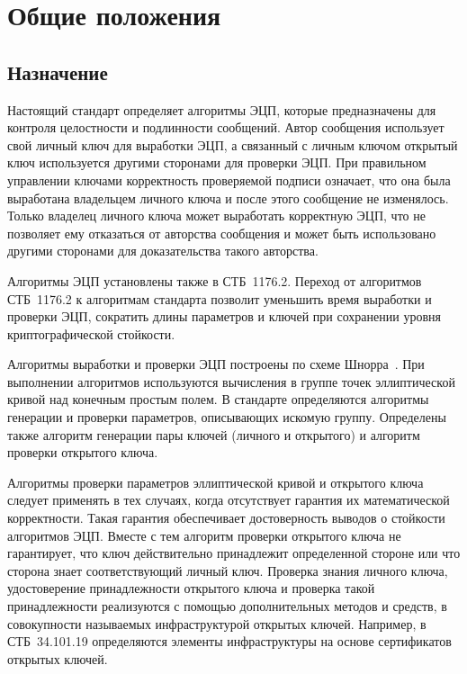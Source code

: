 \chapter{Общие положения}\label{COMMON}

\section{Назначение}\label{COMMON.Dest}

Настоящий стандарт определяет алгоритмы ЭЦП,
которые предназначены для контроля целостности и подлинности сообщений. 
%
Автор сообщения использует свой личный ключ для выработки ЭЦП, 
а связанный с личным ключом открытый ключ используется 
другими сторонами для проверки ЭЦП.
%
При правильном управлении ключами
корректность проверяемой подписи означает, 
что она была выработана владельцем личного ключа и после этого
сообщение не изменялось.
%
Только владелец личного ключа может выработать корректную 
ЭЦП, что не позволяет ему отказаться от авторства сообщения 
и может быть использовано другими сторонами для 
доказательства такого авторства.

\begin{note*}
Алгоритмы ЭЦП установлены также в СТБ~1176.2. Переход от алгоритмов СТБ~1176.2 к
алгоритмам стандарта позволит уменьшить время выработки и проверки ЭЦП,
сократить длины параметров и ключей при сохранении уровня криптографической
стойкости.
\end{note*}

Алгоритмы выработки и проверки ЭЦП 
построены по схеме Шнорра~\cite{Schnorr}.
%
При выполнении алгоритмов используются 
вычисления в группе точек эллиптической кривой
над конечным простым полем.
%
В стандарте определяются алгоритмы генерации 
и проверки параметров, описывающих искомую группу.
%
Определены также алгоритм генерации пары ключей (личного и открытого) 
и алгоритм проверки открытого ключа.

Алгоритмы проверки параметров эллиптической кривой и открытого
ключа следует применять в тех случаях, 
когда отсутствует гарантия их математической корректности.
%
%
Такая гарантия обеспечивает достоверность выводов о стойкости алгоритмов ЭЦП.
%
Вместе с тем
алгоритм проверки открытого ключа не гарантирует, 
что ключ действительно принадлежит определенной стороне
или что сторона знает соответствующий личный ключ.
%
Проверка знания личного ключа, 
удостоверение принадлежности открытого ключа 
и проверка такой принадлежности
реализуются с помощью дополнительных методов и средств, 
в совокупности называемых инфраструктурой открытых ключей.
%
Например, в СТБ~34.101.19 определяются элементы инфраструктуры 
на основе сертификатов открытых ключей.

